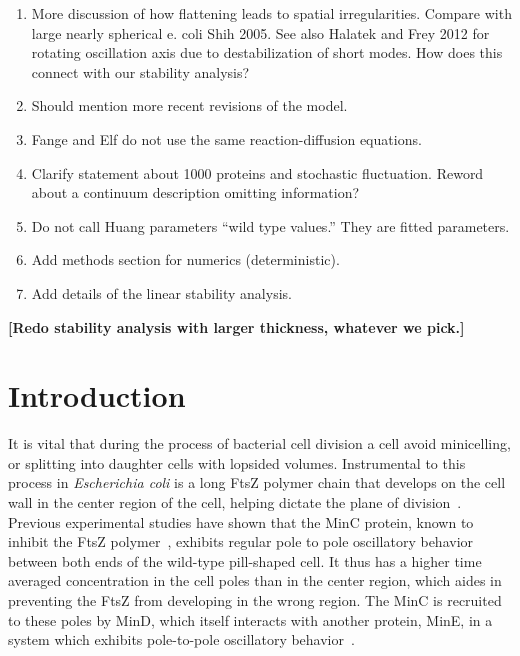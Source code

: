 \documentclass[10pt,letterpaper]{article}
\newcommand{\red}[1]{{\bf \color{red} #1}}
\newcommand{\fixme}[1]{\red{[#1]}}
\begin{document}
{\begin{enumerate}
  \item More discussion of how flattening leads to spatial
    irregularities.  Compare with large nearly spherical e. coli Shih
    2005.  See also Halatek and Frey 2012 for rotating oscillation
    axis due to destabilization of short modes.  How does this connect
    with our stability analysis?
  \item Should mention more recent revisions of the model.
  \item Fange and Elf do not use the same reaction-diffusion
    equations.
  \item Clarify statement about 1000 proteins and stochastic
    fluctuation.  Reword about a continuum description omitting
    information?
  \item Do not call Huang parameters ``wild type values.''  They are
    fitted parameters.
  \item Add methods section for numerics (deterministic).
  \item Add details of the linear stability analysis.
  \end{enumerate}
}

\fixme{Redo stability analysis with larger thickness, whatever we pick.}

\section*{Introduction}
It is vital that during the process of bacterial cell
division a cell avoid minicelling, or splitting into daughter cells
with lopsided volumes.  Instrumental to this process in
\emph{Escherichia coli} is a long FtsZ polymer chain that develops on
the cell wall in the center region of the cell, helping dictate the
plane of division~\cite{adams2009bacterial,
  lutkenhaus2007assembly}. Previous experimental studies have shown
that the MinC protein, known to inhibit the FtsZ
polymer~\cite{shen2010examination}, exhibits regular pole to pole
oscillatory behavior between both ends of the wild-type pill-shaped
cell.  It thus has a higher time averaged concentration in the cell
poles than in the center region, which aides in preventing the FtsZ
from developing in the wrong region.  The MinC is recruited to these
poles by MinD, which itself interacts with another protein, MinE, in a
system which exhibits pole-to-pole oscillatory
behavior~\cite{shapiro2009and, yu1999ftsz,
  meacci2005min,huang2003dynamic,kerr2006division,mannik2009bacterial}.
\end{document}
